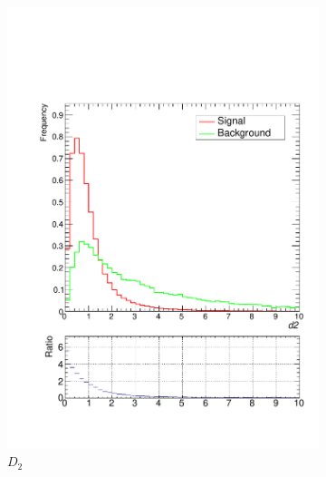 \documentclass[10pt,a4paper]{book}
\begin{document}
\begin{figure}
\begin{subfigure}{0.5\textwidth}
\includegraphics[scale=0.25]{truth/d2}
\caption{$D_2$}
\end{subfigure}
\begin{subfigure}{.5\textwidth}
\centering

\end{subfigure}
\end{figure}
\end{document}
